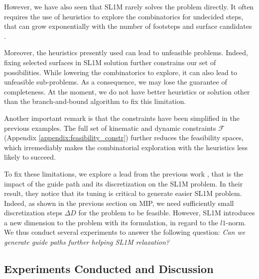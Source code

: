 However, we have also seen that SL1M rarely solves the problem directly. 
It often requires the use of heuristics to explore the combinatorics for undecided steps, that can grow exponentially with the number of footsteps and surface candidates \cite{sl1m_v1}.

Moreover, the heuristics presently used can lead to unfeasible problems. 
Indeed, fixing selected surfaces in SL1M solution further constrains our set of possibilities. While lowering the combinatorics to explore, it can also lead to unfeasible sub-problems. As a consequence, we may lose the guarantee of completeness.
At the moment, we do not have better heuristics or solution other than the branch-and-bound algorithm to fix this limitation.

Another important remark is that the constraints have been simplified in the previous examples.
The full set of kinematic and dynamic constraints $\mathcal{F}$ (Appendix \ref{appendix:feasibility_constr}) further reduces the feasibility spaces, which irremediably makes the combinatorial exploration with the heuristics less likely to succeed.

To fix these limitations, we explore a lead from the previous work \cite{sl1m_v2}, that is the impact of the guide path and its discretization on the SL1M problem.
In their result, they notice that its tuning is critical to generate easier SL1M problem.
Indeed, as shown in the previous section on MIP, we need sufficiently small discretization steps $\Delta D$ for the problem to be feasible. 
However, SL1M introduces a new dimension to the problem with its formulation, in regard to the $l1$-norm.
We thus conduct several experiments to answer the following question: \textit{Can we generate guide paths further helping SL1M relaxation?}


\subsection{Experiments Conducted and Discussion}

